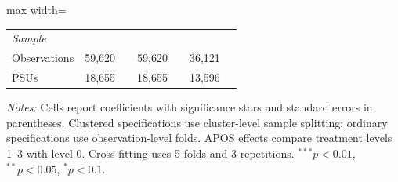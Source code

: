 \begin{table}[htbp]
\begin{adjustbox}{max width=\linewidth}
\begin{tabular}{lcccccc}
\midrule
\multicolumn{7}{l}{\textit{Sample}} \\
Observations & 59,620 &  & 59,620 &  & 36,121 &  \\
PSUs & 18,655 &  & 18,655 &  & 13,596 &  \\
\hline\hline
\end{tabular}
\end{adjustbox}
\par\vspace{3pt}
\begin{minipage}{\linewidth}\scriptsize \textit{Notes:} Cells report coefficients with significance stars and standard errors in parentheses. Clustered specifications use cluster-level sample splitting; ordinary specifications use observation-level folds. APOS effects compare treatment levels 1--3 with level 0. Cross-fitting uses 5 folds and 3 repetitions. $^{***}p<0.01$, $^{**}p<0.05$, $^{*}p<0.1$.\end{minipage}
\end{table}